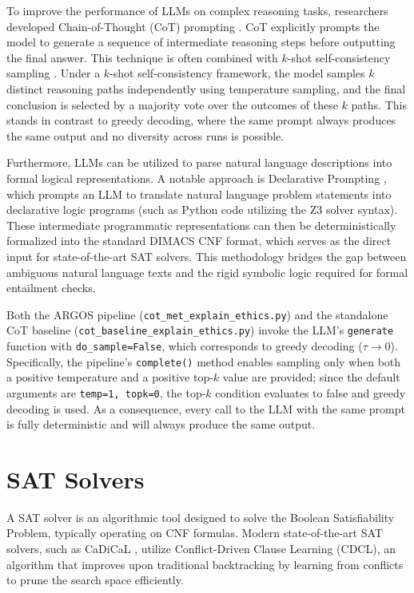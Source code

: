 To improve the performance of LLMs on complex reasoning tasks, researchers developed Chain-of-Thought (CoT) prompting \citep{DBLP:conf/nips/Wei0SBIXCLZ22}. CoT explicitly prompts the model to generate a sequence of intermediate reasoning steps before outputting the final answer. This technique is often combined with $k$-shot self-consistency sampling \citep{wang2022selfconsistency}. Under a $k$-shot self-consistency framework, the model samples $k$ distinct reasoning paths independently using temperature sampling, and the final conclusion is selected by a majority vote over the outcomes of these $k$ paths. This stands in contrast to greedy decoding, where the same prompt always produces the same output and no diversity across runs is possible.

Furthermore, LLMs can be utilized to parse natural language descriptions into formal logical representations. A notable approach is Declarative Prompting \citep{ye2023satlm}, which prompts an LLM to translate natural language problem statements into declarative logic programs (such as Python code utilizing the Z3 solver syntax). These intermediate programmatic representations can then be deterministically formalized into the standard DIMACS CNF format, which serves as the direct input for state-of-the-art SAT solvers. This methodology bridges the gap between ambiguous natural language texts and the rigid symbolic logic required for formal entailment checks.

Both the ARGOS pipeline (\texttt{cot\_met\_explain\_ethics.py}) and the standalone CoT baseline (\texttt{cot\_baseline\_explain\_ethics.py}) invoke the LLM's \texttt{generate} function with \texttt{do\_sample=False}, which corresponds to greedy decoding ($\tau \to 0$). Specifically, the pipeline's \texttt{complete()} method enables sampling only when both a positive temperature and a positive top-$k$ value are provided; since the default arguments are \texttt{temp=1, topk=0}, the top-$k$ condition evaluates to false and greedy decoding is used. As a consequence, every call to the LLM with the same prompt is fully deterministic and will always produce the same output.



\section{SAT Solvers}
\label{sec:satSolvers}
A SAT solver is an algorithmic tool designed to solve the Boolean Satisfiability Problem, typically operating on CNF formulas. Modern state-of-the-art SAT solvers, such as CaDiCaL \citep{biere2024cadical}, utilize Conflict-Driven Clause Learning (CDCL), an algorithm that improves upon traditional backtracking by learning from conflicts to prune the search space efficiently. 

